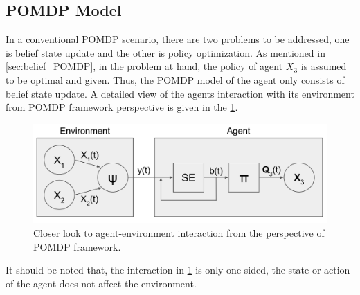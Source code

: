 \subsection{POMDP Model}
\label{sec:exp_pomdp_model}
In a conventional POMDP scenario, there are two problems to be addressed, one is belief state update and the other is policy optimization. As mentioned in \cref{sec:belief_POMDP}, in the problem at hand, the policy of agent $ X_3 $ is assumed to be optimal and given. Thus, the POMDP model of the agent only consists of belief state update. A detailed view of the agents interaction with its environment from POMDP framework perspective is given in the \cref{fig:POMDP_pers}. \\
\begin{figure}[H]
	\begin{center}
		\includegraphics[width=.75\textwidth]{figures/POMDP_graph}
		\caption{Closer look to agent-environment interaction from the perspective of POMDP framework.}
		\label{fig:POMDP_pers}
	\end{center}
\end{figure}
It should be noted that, the interaction in \cref{fig:POMDP_pers} is only one-sided, the state or action of the agent does not affect the environment.
